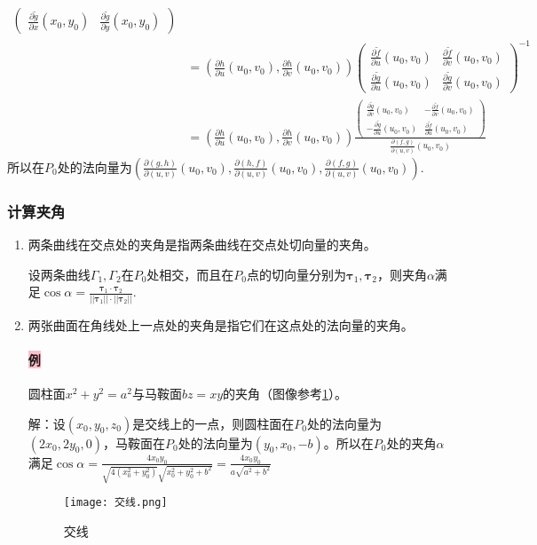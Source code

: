 \documentclass[UTF8]{ctexart}
\newcommand{\p}[2]{\frac{\partial #1}{\partial #2}}
\begin{document}
\begin{enumerate}[(1)]
\begin{align*}
\begin{pmatrix}
                \p{\tilde{g}}{x}(x_0,y_0)&\p{\tilde{g}}{y}(x_0,y_0)
            \end{pmatrix}\\
            &=\left(\p{h}{u}(u_0,v_0),\p{h}{v}(u_0,v_0)\right)\begin{pmatrix}
                \p{\tilde{f}}{u}(u_0,v_0)& \p{\tilde{f}}{v}(u_0,v_0)\\
                \p{\tilde{g}}{u}(u_0,v_0)& \p{\tilde{g}}{v}(u_0,v_0)
            \end{pmatrix}^{-1}\\
            &=\left(\p{h}{u}(u_0,v_0),\p{h}{v}(u_0,v_0)\right)\frac{\begin{pmatrix}
                \p{\tilde{g}}{v}(u_0,v_0)&-\p{\tilde{f}}{v}(u_0,v_0)\\
                -\p{\tilde{g}}{u}(u_0,v_0)&\p{\tilde{f}}{u}(u_0,v_0)
            \end{pmatrix}}{\p{(f,g)}{(u,v)}(u_0,v_0)}
        \end{align*}
        所以在$P_0$处的法向量为$\left(\p{(g,h)}{(u,v)}(u_0,v_0),\p{(h,f)}{(u,v)}(u_0,v_0),\p{(f,g)}{(u,v)}(u_0,v_0)\right)$.






        \subsubsection{计算夹角}
        \begin{enumerate}[(1)]
            \item 两条曲线在交点处的夹角是指两条曲线在交点处切向量的夹角。
            
            设两条曲线$\Gamma_1,\Gamma_2$在$P_0$处相交，而且在$P_0$点的切向量分别为$\boldsymbol{\tau}_1,\boldsymbol{\tau}_2$，则夹角$\alpha$满足$\cos\alpha=\frac{\boldsymbol{\tau}_1\cdot\boldsymbol{\tau}_2}{||\boldsymbol{\tau}_1||\cdot||\boldsymbol{\tau}_2||}$.
            \item 两张曲面在角线处上一点处的夹角是指它们在这点处的法向量的夹角。
            
            \paragraph{\colorbox{pink}{例}}圆柱面$x^2+y^2=a^2$与马鞍面$bz=xy$的夹角（图像参考\ref{交线}）。

            解：设$(x_0,y_0,z_0)$是交线上的一点，则圆柱面在$P_0$处的法向量为$(2x_0,2y_0,0)$，马鞍面在$P_0$处的法向量为$(y_0,x_0,-b)$。所以在$P_0$处的夹角$\alpha$满足$\cos\alpha=\frac{4x_0y_0}{\sqrt{4(x_0^2+y_0^2)}\sqrt{x_0^2+y_0^2+b^2}}=\frac{4x_0y_0}{a\sqrt{a^2+b^2}}$
            \begin{figure}[h!t!b!p]
                \centering
                \texttt{[image: 交线.png]}
                \caption{交线}
                \label{交线}
            \end{figure}
        \end{enumerate}
    \end{enumerate}
\end{document}
